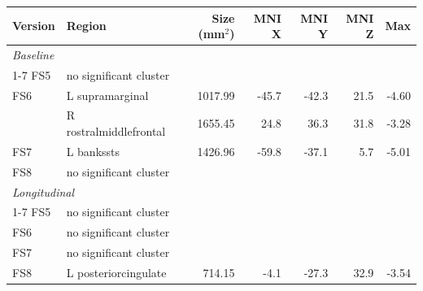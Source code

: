 \begin{tabular}{llrrrrr}
\toprule
Version & Region & Size (mm$^2$) & MNI X & MNI Y & MNI Z & Max \\
\midrule
\multicolumn{7}{l}{\textit{Baseline}} \\
\cmidrule(lr){1-7}
FS5 & \multicolumn{6}{l}{no significant cluster} \\
\rowcolor{gray!12}FS6 & L supramarginal & 1017.99 & -45.7 & -42.3 & 21.5 & -4.60 \\
\rowcolor{gray!12} & R rostralmiddlefrontal & 1655.45 & 24.8 & 36.3 & 31.8 & -3.28 \\
FS7 & L bankssts & 1426.96 & -59.8 & -37.1 & 5.7 & -5.01 \\
\rowcolor{gray!12}FS8 & \multicolumn{6}{l}{no significant cluster} \\
\multicolumn{7}{l}{\textit{Longitudinal}} \\
\cmidrule(lr){1-7}
FS5 & \multicolumn{6}{l}{no significant cluster} \\
\rowcolor{gray!12}FS6 & \multicolumn{6}{l}{no significant cluster} \\
FS7 & \multicolumn{6}{l}{no significant cluster} \\
\rowcolor{gray!12}FS8 & L posteriorcingulate & 714.15 & -4.1 & -27.3 & 32.9 & -3.54 \\
\bottomrule
\end{tabular}
